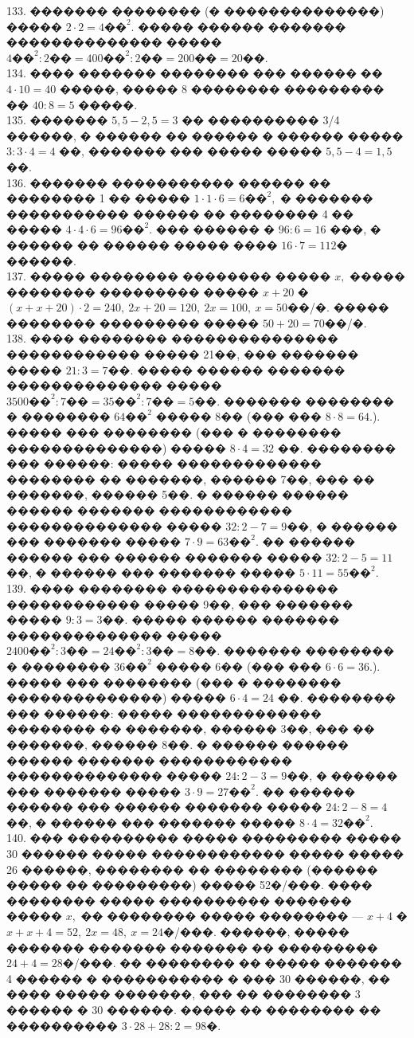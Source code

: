 \documentclass[12pt]{article}
\begin{document}
133. ������� �������� (� ��������������) ����� $2\cdot2=4\text{��}^2.$ ����� ������ ������� �������������� ����� $4\text{��}^2:2\text{��}=400\text{��}^2:2\text{��}=
200\text{��}=20$��.\\
134. ���� ������� �������� ��� ������ �� $4\cdot10=40$ �����, ����� 8 �������� ��������� �� $40:8=5$ �����.\\
135. ������� $5,5-2,5=3$ �� ���������� 3/4 ������, � ������ �� ������ � ������ ����� $3:3\cdot4=4$ ��, ������� ��� ����� ����� $5,5-4=1,5$��.\\
136. ������� ����������� ������ �� �������� 1 �� ����� $1\cdot1\cdot6=6\text{��}^2,$ � ������� ����������� ������ �� �������� 4 �� ����� $4\cdot4\cdot6=96\text{��}^2.$ ��� ������ � $96:6=16$ ���, � ������ �� ������ ����� ���� $16\cdot7=112$� ������.\\
137. ����� �������� �������� ����� $x,$ ����� �������� ��������� ����� $x+20$ � $(x+x+20)\cdot2=240,\ 2x+20=120,\ 2x=100,\ x=50$��/�. ����� �������� ��������� ����� $50+20=70$��/�.\\
138. ���� �������� ��������������� ������������ ����� 21��, ��� ������� ����� $21:3=7\text{��}.$ ����� ������ ������� �������������� ����� $3500\text{��}^2:7\text{��}=35\text{��}^2:7\text{��}=5\text{��}$. ������� �������� � �������� $64\text{��}^2$ ����� 8�� (��� ��� $8\cdot8=64.$). ����� ��� �������� (��� � �������� ��������������) ����� $8\cdot4=32$ ��. �������� ��� ������: ����� ������������� �������� �� �������, ������ 7��, ��� �� �������, ������ 5��. � ������ ������ ������ ������� ������������ �������������� ����� $32:2-7=9$��, � ������ ��� ������� ����� $7\cdot9=63\text{��}^2.$ �� ������ ������ ��� ������ ������� ����� $32:2-5=11$��, � ������ ��� ������� ����� $5\cdot11=55\text{��}^2.$\\
139. ���� �������� ��������������� ������������ ����� 9��, ��� ������� ����� $9:3=3\text{��}.$ ����� ������ ������� �������������� ����� $2400\text{��}^2:3\text{��}=24\text{��}^2:3\text{��}=8\text{��}$. ������� �������� � �������� $36\text{��}^2$ ����� 6�� (��� ��� $6\cdot6=36.$). ����� ��� �������� (��� � �������� ��������������) ����� $6\cdot4=24$ ��. �������� ��� ������: ����� ������������� �������� �� �������, ������ 3��, ��� �� �������, ������ 8��. � ������ ������ ������ ������� ������������ �������������� ����� $24:2-3=9$��, � ������ ��� ������� ����� $3\cdot9=27\text{��}^2.$ �� ������ ������ ��� ������ ������� ����� $24:2-8=4$��, � ������ ��� ������� ����� $8\cdot4=32\text{��}^2.$\\
140. ��� ���������� ����� ��������� ����� 30 ������ ����� ������������ ����� ����� 26 ������, �������� �� �������� (������ ����� �� ���������) ����� 52�/���. ���� �������� ����� ���������� ������� ����� $x,$ �� �������� ����� �������� --- $x+4$ � $x+x+4=52,\ 2x=48,\ x=24$�/���. ������, ����� ������� ������� ������� �� ��������� $24+4=28$�/���. �� �������� �� ����� ������� 4 ������ � ����������� � ��� 30 ������, �� ���� ����� �������, ��� �� �������� 3 ������ � 30 ������. ����� �� �������� �� ���������� $3\cdot28+28:2=98$�.\\
\end{document}
